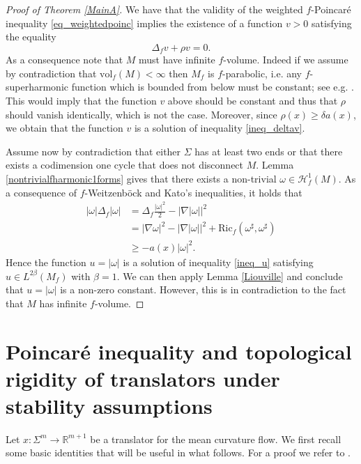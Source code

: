 \documentclass[11pt, leqno]{amsart}
\begin{document}
\begin{proof}[Proof of Theorem \ref{MainA}]
We have that the validity of the weighted $f$-Poincar\'e inequality \eqref{eq_weightedpoinc} implies the existence of a function $v>0$ satisfying the equality
\[
\Delta_f v+\rho v=0.
\]
As a consequence note that $M$ must have infinite $f$-volume. Indeed if we assume by contradiction that $\mathrm{vol}_{f}(M)<\infty$ then $M_f$ is $f$-parabolic, i.e. any $f$-superharmonic function which is bounded from below must be constant; see e.g. \cite{Grig_Weight}. This would imply that the function $v$ above should be constant and thus that $\rho$ should vanish identically, which is not the case. Moreover, since $\rho(x)\geq \delta a(x)$, we obtain that the function $v$ is a solution of inequality \eqref{ineq_deltav}. 

Assume now by contradiction that either $\Sigma$ has at least two ends or that there exists a codimension one cycle that does not disconnect $M$. Lemma \ref{nontrivialfharmonic1forms} gives that there exists a non-trivial $\omega\in \mathcal{H}^1_f(M)$. As a consequence of $f$-Weitzenb\"ock and Kato's inequalities, it holds that
\begin{align*}
|\omega|\Delta_f |\omega|&=\Delta_f\frac{|\omega|^2}{2}-|\nabla |\omega||^2\\
&=|\nabla \omega|^2-|\nabla |\omega||^2+\mathrm{Ric}_f(\omega^\sharp,\omega^\sharp)\\
&\geq-a(x)|\omega|^2.
\end{align*}
Hence the function $u=|\omega|$ is a solution of inequality \eqref{ineq_u} satisfying $u\in L^{2\beta}(M_f)$ with $\beta=1$. We can then apply Lemma \ref{Liouville} and conclude that $u=|\omega|$ is a non-zero constant. However, this is in contradiction to the fact that $M$ has infinite $f$-volume.
\end{proof}

\section{Poincar\'e inequality and topological rigidity of translators under stability assumptions}\label{SecPoincareTranslators}

Let $x:\Sigma^m\to\mathbb{R}^{m+1}$ be a translator for the mean curvature flow. We first recall some basic identities that will be useful in what follows. For a proof we refer to \cite[Lemma 2.1]{IR_MathZ}.
\end{document}
